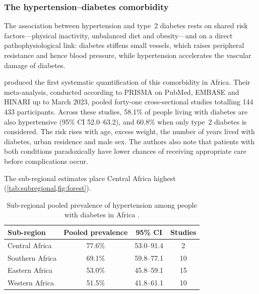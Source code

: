\subsubsection{The hypertension--diabetes comorbidity}\label{sec:comorbidity}

The association between hypertension and type~2 diabetes rests on shared risk factors---physical inactivity, unbalanced diet and obesity---and on a direct pathophysiological link: diabetes stiffens small vessels, which raises peripheral resistance and hence blood pressure, while hypertension accelerates the vascular damage of diabetes.

\Textcite{hinneh2023} produced the first systematic quantification of this comorbidity in Africa. Their meta-analysis, conducted according to PRISMA on PubMed, EMBASE and HINARI up to March 2023, pooled forty-one cross-sectional studies totalling 144\,433 participants. Across these studies, 58.1\% of people living with diabetes are also hypertensive (95\% CI 52.0--63.2), and 60.8\% when only type~2 diabetes is considered. The risk rises with age, excess weight, the number of years lived with diabetes, urban residence and male sex. The authors also note that patients with both conditions paradoxically have lower chances of receiving appropriate care before complications occur.

The sub-regional estimates place Central Africa highest (\cref{tab:subregional,fig:forest}).

\begin{table}[htbp]
\centering\small
\caption{Sub-regional pooled prevalence of hypertension among people with diabetes in Africa \parencite{hinneh2023}.}\label{tab:subregional}
\begin{tabular}{@{}lccc@{}}
\toprule
\textbf{Sub-region} & \textbf{Pooled prevalence} & \textbf{95\% CI} & \textbf{Studies} \\
\midrule
Central Africa & 77.6\% & 53.0--91.4 & 2 \\
Southern Africa & 69.1\% & 59.8--77.1 & 10 \\
Eastern Africa & 53.0\% & 45.8--59.1 & 15 \\
Western Africa & 51.5\% & 41.8--61.1 & 10 \\
\bottomrule
\end{tabular}
\end{table}

